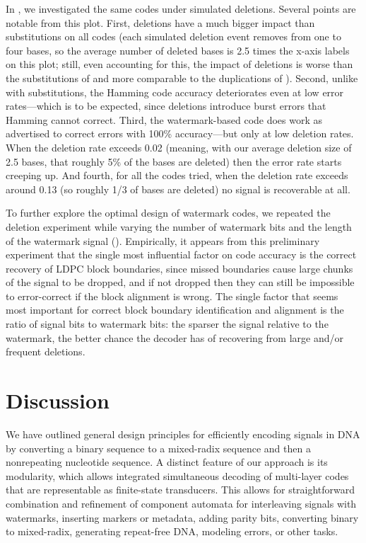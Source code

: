 \documentclass[english]{article}
\begin{document}
In , we investigated the same codes under simulated deletions.
Several points are notable from this plot.
First, deletions have a much bigger impact than substitutions on all codes
(each simulated deletion event removes from one to four bases, so the average number of deleted bases
is 2.5 times the x-axis labels on this plot; still, even accounting for this, the impact of deletions
is worse than the substitutions of  and more comparable to the duplications of ).
Second, unlike with substitutions, the Hamming code accuracy deteriorates even at low error rates---which
is to be expected, since deletions introduce burst errors that Hamming cannot correct.
Third, the watermark-based code does work as advertised to correct errors with 100\% accuracy---but
only at low deletion rates.
When the deletion rate exceeds 0.02 (meaning, with our average deletion size of 2.5 bases, that roughly
5\% of the bases are deleted) then the error rate starts creeping up.
And fourth, for all the codes tried, when the deletion rate exceeds around 0.13 (so roughly 1/3 of bases are deleted)
no signal is recoverable at all.

To further explore the optimal design of watermark codes, we repeated the deletion experiment
while varying the number of watermark bits and the length of the watermark signal ().
Empirically, it appears from this preliminary experiment that the single most influential factor on code accuracy is the
correct recovery of LDPC block boundaries, since missed boundaries cause large chunks of the signal
to be dropped, and if not dropped then they can still be impossible to error-correct if the block alignment is wrong.
The single factor that seems most important for correct block boundary identification and alignment
is the ratio of signal bits to watermark bits: the sparser the signal relative to the watermark,
the better chance the decoder has of recovering from large and/or frequent deletions.

\section{Discussion}

We have outlined general design principles for efficiently encoding signals in DNA
by converting a binary sequence to a mixed-radix sequence and then a nonrepeating nucleotide sequence.
A distinct feature of our approach is its modularity,
which allows integrated simultaneous decoding of multi-layer codes that are representable as finite-state transducers.
This allows for straightforward combination and refinement of component automata for
interleaving signals with watermarks, inserting markers or metadata, adding parity bits, converting binary to mixed-radix, generating repeat-free DNA,
modeling errors, or other tasks.
\end{document}
